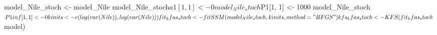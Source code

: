 \begin{Schunk}
\begin{Sinput}
 model_Nile_stoch <- model_Nile
 model_Nile_stoch$a1[1, 1] <- 0
 model_Nile_stoch$P1[1, 1] <- 1000
 model_Nile_stoch$P1inf[1, 1] <- 0
 kinits <- c(log(var(Nile)), log(var(Nile)))
 fit_kfas_stoch <- fitSSM(model_Nile_stoch, kinits, method = "BFGS")
 kfs_kfas_stoch <- KFS(fit_kfas_stoch$model)
\end{Sinput}
\end{Schunk}
